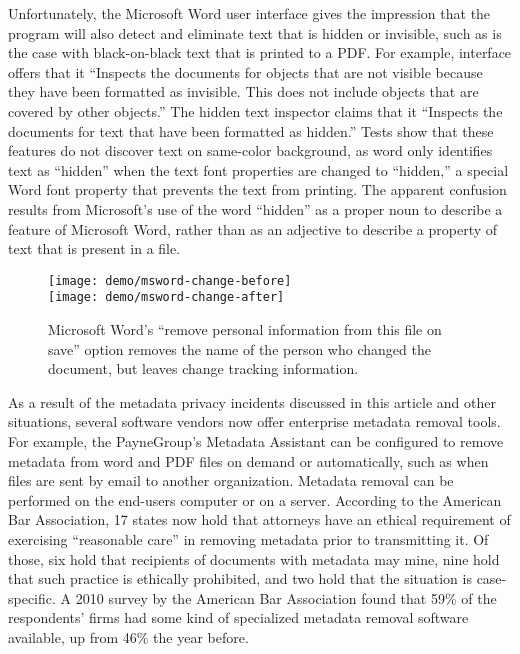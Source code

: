 Unfortunately, the Microsoft Word user interface gives the impression
that the program will also detect and eliminate text that is hidden or
invisible, such as is the case with black-on-black text that is
printed to a PDF. For example, interface offers that it 
``Inspects the documents for objects that are not visible because they
have been formatted as invisible. This does not include objects that
are covered by other objects.'' The hidden text inspector claims that
it ``Inspects the documents for text that have been formatted as
hidden.''  Tests show that these features do
not discover text on same-color background, as word only identifies text as ``hidden'' when the
text font properties are changed to ``hidden,'' a special Word font
property that prevents the text from printing. The apparent confusion results
from Microsoft's use of the word ``hidden'' as a proper noun to
describe a feature of Microsoft Word, rather than as an adjective to
describe a property of text that is present in a file.

\begin{figure}
\texttt{[image: demo/msword-change-before]}\\
\texttt{[image: demo/msword-change-after]}\\
\caption{Microsoft Word's ``remove personal information from this file
  on save'' option removes the name of the person who changed the
  document, but leaves change tracking information.}\label{msword-remove-demo}
\end{figure}



As a result of the metadata privacy incidents discussed in this
article and other situations, several software vendors now offer
enterprise metadata removal tools. For example, the PayneGroup's
Metadata Assistant can be configured to remove metadata from word and
PDF files on demand or automatically, such as
when files are sent by email to another organization. Metadata removal
can be performed on the end-users computer or on a server. According
to the American Bar Association, 17 states now hold that attorneys
have an ethical requirement of exercising ``reasonable care'' in
removing metadata prior to transmitting it\cite{aba-survey}. Of those,
six hold that recipients of documents with metadata may mine,  nine
hold that such practice is ethically prohibited, and two hold that the
situation is case-specific. A 2010 survey by the American Bar
Association found that 59\% of the respondents' firms had some kind of
specialized metadata removal software available, up from 46\% the year
before.

